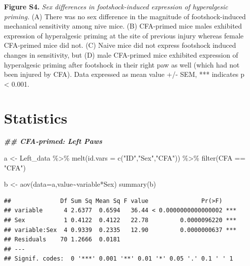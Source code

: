 \documentclass[
]{book}
\newenvironment{Shaded}{\begin{snugshade}}{\end{snugshade}}
\newcommand{\AttributeTok}[1]{\textcolor[rgb]{0.77,0.63,0.00}{#1}}
\newcommand{\DocumentationTok}[1]{\textcolor[rgb]{0.56,0.35,0.01}{\textbf{\textit{#1}}}}
\newcommand{\FunctionTok}[1]{\textcolor[rgb]{0.00,0.00,0.00}{#1}}
\newcommand{\NormalTok}[1]{#1}
\newcommand{\OtherTok}[1]{\textcolor[rgb]{0.56,0.35,0.01}{#1}}
\newcommand{\SpecialCharTok}[1]{\textcolor[rgb]{0.00,0.00,0.00}{#1}}
\newcommand{\StringTok}[1]{\textcolor[rgb]{0.31,0.60,0.02}{#1}}
\begin{document}
\textbf{Figure S4.} \emph{Sex differences in footshock-induced expression of hyperalgesic priming.} (A) There was no sex difference in the magnitude of footshock-induced mechanical sensitivity among nive mice. (B) CFA-primed mice males exhibited expression of hyperalgesic priming at the site of previous injury whereas female CFA-primed mice did not. (C) Naive mice did not express footshock induced changes in sensitivity, but (D) male CFA-primed mice exhibited expression of hyperalgesic priming after footshock in their right paw as well (which had not been injured by CFA). Data expressed as mean value +/- SEM, *** indicates p \textless{} 0.001.

\hypertarget{statistics-5}{%
\section*{Statistics}\label{statistics-5}}

\begin{Shaded}
\begin{Highlighting}[]
\DocumentationTok{\#\# CFA{-}primed: Left Paws}

\NormalTok{a }\OtherTok{\textless{}{-}}\NormalTok{ Left\_data }\SpecialCharTok{\%\textgreater{}\%}
  \FunctionTok{melt}\NormalTok{(}\AttributeTok{id.vars =} \FunctionTok{c}\NormalTok{(}\StringTok{"ID"}\NormalTok{,}\StringTok{"Sex"}\NormalTok{,}\StringTok{"CFA"}\NormalTok{)) }\SpecialCharTok{\%\textgreater{}\%} 
  \FunctionTok{filter}\NormalTok{(CFA }\SpecialCharTok{==} \StringTok{"CFA"}\NormalTok{)}

\NormalTok{b }\OtherTok{\textless{}{-}} \FunctionTok{aov}\NormalTok{(}\AttributeTok{data=}\NormalTok{a,value}\SpecialCharTok{\textasciitilde{}}\NormalTok{variable}\SpecialCharTok{*}\NormalTok{Sex)}
\FunctionTok{summary}\NormalTok{(b)}
\end{Highlighting}
\end{Shaded}

\begin{verbatim}
##              Df Sum Sq Mean Sq F value               Pr(>F)    
## variable      4 2.6377  0.6594   36.44 < 0.0000000000000002 ***
## Sex           1 0.4122  0.4122   22.78         0.0000096220 ***
## variable:Sex  4 0.9339  0.2335   12.90         0.0000000637 ***
## Residuals    70 1.2666  0.0181                                 
## ---
## Signif. codes:  0 '***' 0.001 '**' 0.01 '*' 0.05 '.' 0.1 ' ' 1
\end{verbatim}
\end{document}
